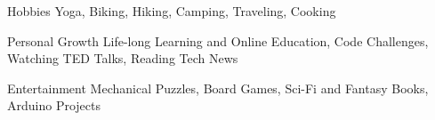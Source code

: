 

\begin{cvskills}

  \cvskill
    {Hobbies} %
    {Yoga, Biking, Hiking, Camping, Traveling, Cooking} %

  \cvskill
    {Personal Growth} %
    {Life-long Learning and Online Education, Code Challenges, Watching TED Talks, Reading Tech News} %

  \cvskill
    {Entertainment} %
    {Mechanical Puzzles, Board Games, Sci-Fi and Fantasy Books, Arduino Projects} %

\end{cvskills}
